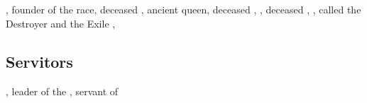 


\section[Dragons]{}
\begin{dramatispersonae}
  , 
    founder of the \draconian race, 
    deceased
  \dramitem[Tiamat]{\TyarithXserasshana}{\dragon}{\female}, 
    ancient \dragon queen,
    deceased
  \dramitem[Nexagglachel]{\RaemythNexagglachel}{\dragon}{\male}, 
    , 
    deceased
  \dramitem[Ishnaruchaefir]{\QuessanthIshnaruchaefir}{\dragon}{\male}, 
    ,
    called the Destroyer and the Exile
  \dramitem[Secherdamon]{\IrocasSecherdamon}{\dragon}{\male}, 
  \dramitem[Nzessuacrith]{\CryocasNzessuacrith}{\dragon}{\female}
\end{dramatispersonae}

\subsection{Servitors}
\begin{dramatispersonae}
  \dramitem[Psyrex]{\LocarPsyrex}{\scatha}{\male}, 
    leader of the 
  \dramitem[Criseis]{\Criseis}{\scatha}{\female}, 
    servant of \Ishnaruchaefir
\end{dramatispersonae}





